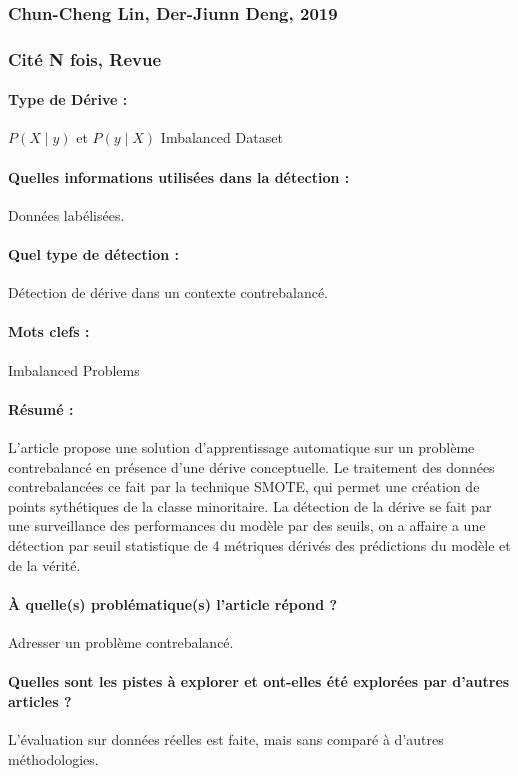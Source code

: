 \documentclass[11pt,a4paper]{report}
\begin{document}
\subsubsection{Chun-Cheng Lin, Der-Jiunn Deng, 2019}

\subsubsection{Cité N fois, Revue}

\paragraph{Type de Dérive :} $P(X\mid y)$ et $P(y \mid X)$ Imbalanced Dataset
\paragraph{Quelles informations utilisées dans la détection :} Données labélisées.
\paragraph{Quel type de détection :} Détection de dérive dans un  contexte contrebalancé.

\paragraph{Mots clefs :} Imbalanced Problems

\paragraph{Résumé :} L'article propose une solution d'apprentissage automatique sur un problème contrebalancé en présence d'une dérive conceptuelle. Le traitement des données contrebalancées ce fait par la technique SMOTE, qui permet une création de points sythétiques de la classe minoritaire. La détection de la dérive se fait par une surveillance des performances du modèle par des seuils, on a affaire a une détection par seuil statistique de 4 métriques dérivés des prédictions du modèle et de la vérité.

\paragraph{À quelle(s) problématique(s) l'article répond ?} Adresser un problème contrebalancé.

\paragraph{Quelles sont les pistes à explorer et ont-elles  été explorées par d'autres articles ?} L'évaluation sur données réelles est faite, mais sans comparé à d'autres méthodologies.
\end{document}
